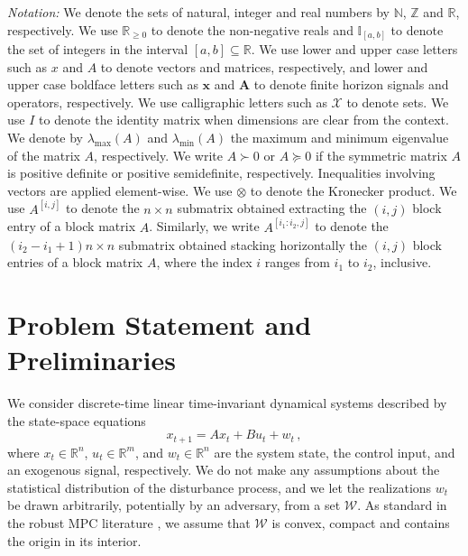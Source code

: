 \documentclass[conference]{IEEEtran}
\begin{document}
\emph{Notation:}
We denote the sets of natural, integer and real numbers by $\mathbb{N}$, $\mathbb{Z}$ and $\mathbb{R}$, respectively. We use $\mathbb{R}_{\geq 0}$ to denote the non-negative reals and $\mathbb{I}_{[a,b]}$ to denote the set of integers in the interval $[a, b] \subseteq \mathbb{R}$. We use lower and upper case letters such as $x$ and $A$ to denote vectors and matrices, respectively, and lower and upper case boldface letters such as $\mathbf{x}$ and $\mathbf{A}$ to denote finite horizon signals and operators, respectively. We use calligraphic letters such as $\mathcal{X}$ to denote sets. We use $I$ to denote the identity matrix when dimensions are clear from the context. We denote by $\lambda_{\operatorname{max}}(A)$ and $\lambda_{\operatorname{min}}(A)$ the maximum and minimum eigenvalue of the matrix $A$, respectively. We write $A \succ 0$ or $A \succeq 0$ if the symmetric matrix $A$ is positive definite or positive semidefinite, respectively. Inequalities involving vectors are applied element-wise. We use $\otimes$ to denote the Kronecker product. We use $A^{[i,j]}$ to denote the $n \times n$ submatrix obtained extracting the $(i,j)$ block entry of a block matrix $A$. Similarly, we write $A^{[i_1:i_2,j]}$ to denote the $(i_2 - i_1 + 1)n \times n$ submatrix obtained stacking horizontally the $(i,j)$ block entries of a block matrix $A$, where the index $i$ ranges from $i_1$ to $i_2$, inclusive.

\section{Problem Statement and Preliminaries}
\label{sec:problem_statement_preliminaries}
We consider discrete-time linear time-invariant dynamical systems described by the state-space equations
\begin{equation}
    \label{eq:lti_system_dynamics}
    x_{t+1} = A x_t + B u_t + w_t\,,
\end{equation}
where $x_t \in \mathbb{R}^n$, $u_t \in \mathbb{R}^m$, and $w_t \in \mathbb{R}^n$ are the system state, the control input, and an exogenous signal, respectively. We do not make any assumptions about the statistical distribution of the disturbance process, and we let the realizations $w_t$ be drawn arbitrarily, potentially by an adversary, from a set $\mathcal{W}$. As standard in the robust MPC literature \cite{rawlings2017model}, we assume that $\mathcal{W}$ is convex, compact and contains the origin in its interior.
\end{document}
